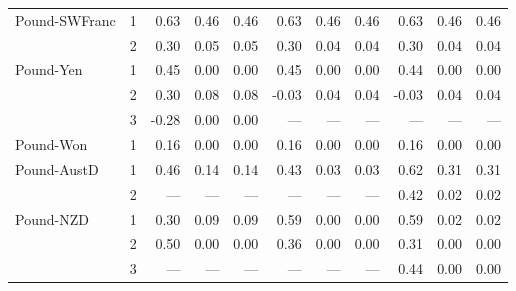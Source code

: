 \documentclass[12pt]{article}
\begin{document}
\begin{table}
\begin{threeparttable}
\begin{tabular}[c]{l c r r r | r r r | r r r}
\noalign{\smallskip}
Pound-SWFranc & 1 & 0.63 & 0.46 & 0.46 & 0.63  & 0.46  & 0.46  & 0.63  & 0.46  & 0.46  \\
		      & 2 & 0.30 & 0.05 & 0.05 & 0.30  & 0.04  & 0.04  & 0.30  & 0.04  & 0.04  \\
\noalign{\smallskip} \noalign{\smallskip}
Pound-Yen & 1 & 0.45 & 0.00 & 0.00 & 0.45  & 0.00  & 0.00  & 0.44  & 0.00  & 0.00  \\
		  & 2 & 0.30 & 0.08 & 0.08 & -0.03  & 0.04  & 0.04  & -0.03  & 0.04  & 0.04  \\
		  & 3 & -0.28 & 0.00 & 0.00 & ---  & ---  & ---  & ---  & ---  & ---  \\
\noalign{\smallskip} \noalign{\smallskip}
Pound-Won & 1 & 0.16 & 0.00 & 0.00 & 0.16  & 0.00  & 0.00  & 0.16  & 0.00  & 0.00  \\
\noalign{\smallskip} \noalign{\smallskip}
Pound-AustD & 1 & 0.46 & 0.14 & 0.14 & 0.43  & 0.03  & 0.03  & 0.62  & 0.31  & 0.31  \\
            & 2 & --- & --- & --- & ---  & ---  & ---  & 0.42  & 0.02  & 0.02  \\
\noalign{\smallskip} \noalign{\smallskip}
Pound-NZD & 1 & 0.30 & 0.09 & 0.09 & 0.59  & 0.00  & 0.00  & 0.59  & 0.02  & 0.02  \\
		  & 2 & 0.50 & 0.00 & 0.00 & 0.36  & 0.00  & 0.00  & 0.31  & 0.00  & 0.00  \\
		  & 3 & --- & --- & --- & ---  & ---  & ---  & 0.44  & 0.00  & 0.00  \\
\hline \hline
	\end{tabular}
\end{threeparttable}
\end{table}
\end{document}
